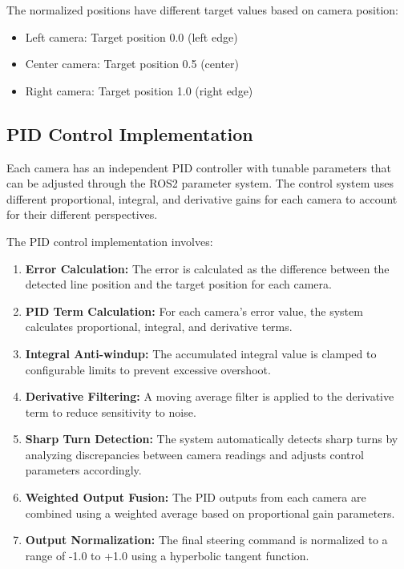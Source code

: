 \documentclass[9pt,technote]{IEEEtran}
\begin{document}
The normalized positions have different target values based on camera position:
\begin{itemize}
    \item Left camera: Target position 0.0 (left edge)
    \item Center camera: Target position 0.5 (center)
    \item Right camera: Target position 1.0 (right edge)
\end{itemize}

\subsection{PID Control Implementation}
Each camera has an independent PID controller with tunable parameters that can be adjusted through the ROS2 parameter system. The control system uses different proportional, integral, and derivative gains for each camera to account for their different perspectives.

The PID control implementation involves:

\begin{enumerate}
    \item \textbf{Error Calculation:} The error is calculated as the difference between the detected line position and the target position for each camera.
    
    \item \textbf{PID Term Calculation:} For each camera's error value, the system calculates proportional, integral, and derivative terms.
    
    \item \textbf{Integral Anti-windup:} The accumulated integral value is clamped to configurable limits to prevent excessive overshoot.
    
    \item \textbf{Derivative Filtering:} A moving average filter is applied to the derivative term to reduce sensitivity to noise.
    
    \item \textbf{Sharp Turn Detection:} The system automatically detects sharp turns by analyzing discrepancies between camera readings and adjusts control parameters accordingly.
    
    \item \textbf{Weighted Output Fusion:} The PID outputs from each camera are combined using a weighted average based on proportional gain parameters.
    
    \item \textbf{Output Normalization:} The final steering command is normalized to a range of -1.0 to +1.0 using a hyperbolic tangent function.
\end{enumerate}
\end{document}
